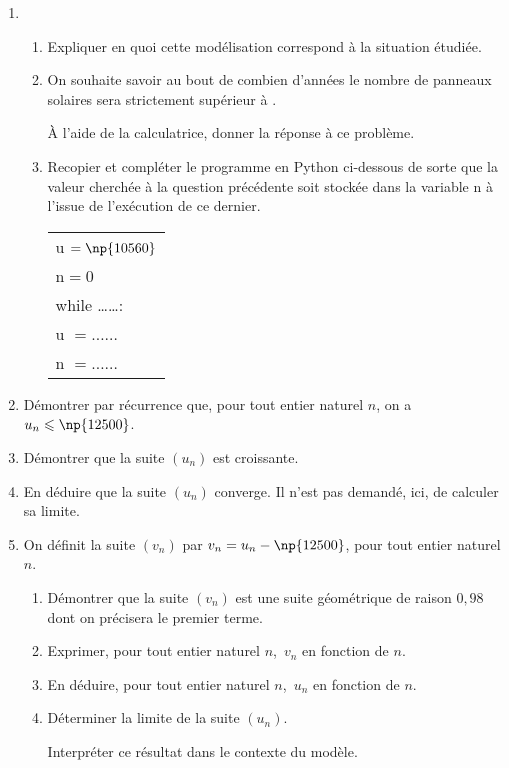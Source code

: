 \begin{enumerate}
\item 
	\begin{enumerate}
		\item  Expliquer en quoi cette modélisation correspond à la situation étudiée.
		\item  On souhaite savoir au bout de combien d'années le nombre de panneaux solaires sera strictement supérieur à .
		
À l'aide de la calculatrice, donner la réponse à ce
problème.
		\item  Recopier et compléter le programme en Python ci-dessous de sorte que la valeur
cherchée à la question précédente soit stockée dans la variable n à l'issue de l'exécution de ce dernier.
\begin{center}
\begin{tabular}{|l|}\hline
u $= \np{10560}$\\
n$ =0$\\
while  \ldots \ldots :\\
\qquad u $= \ldots \ldots$ \\
\qquad n $= \ldots \ldots$\\ \hline
\end{tabular}
\end{center}

	\end{enumerate}
\item Démontrer par récurrence que, pour tout entier naturel $n$, on a $u_n \leqslant \np{12500}$.
\item Démontrer que la suite $\left(u_n\right)$ est croissante.
\item En déduire que la suite $\left(u_n\right)$ converge. Il n'est pas demandé, ici, de calculer sa limite.
\item On définit la suite $\left(v_n\right)$  par $v_n = u_n - \np{12500}$, pour tout entier naturel $n$.
	\begin{enumerate}
		\item Démontrer que la suite $\left(v_n\right)$ est une suite géométrique de raison $0,98$ dont on précisera le premier terme.
		\item Exprimer, pour tout entier naturel $n$,\, $v_n$ en fonction de $n$.
		\item En déduire, pour tout entier naturel $n$,\, $u_n$ en fonction de $n$.
		\item Déterminer la limite de la suite $\left(u_n\right)$. 
		
Interpréter ce résultat dans le contexte du modèle.
	\end{enumerate}
\end{enumerate}

